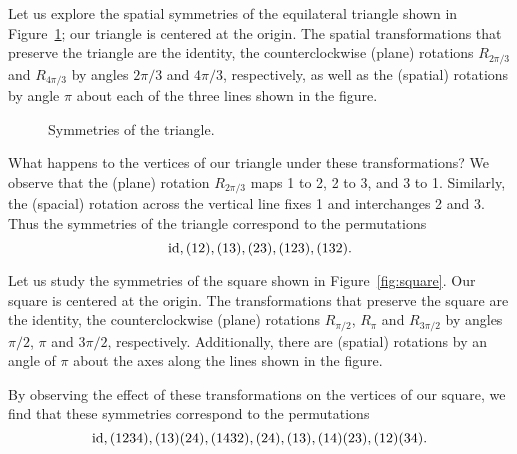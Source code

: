 



\begin{example}
Let us explore the spatial symmetries of the equilateral triangle shown in Figure~\ref{fig:triangle}; our triangle is centered at the origin. The spatial transformations that preserve the triangle are the identity, the counterclockwise (plane) rotations  $R_{2\pi/3}$  and  $R_{4\pi/3}$ by angles $2\pi/3$ and  $4\pi/3$, respectively, as well as the (spatial) rotations by angle  $\pi$  about each of the three lines shown in the figure.
\begin{figure}[h]
\caption{Symmetries of the triangle.}
\label{fig:triangle}
\end{figure}

What happens to the vertices of our triangle under these transformations? We observe that the (plane) rotation  $R_{2\pi/3}$  maps 1 to 2, 2 to 3, and 3 to 1. Similarly, the (spacial) rotation across the vertical line fixes 1 and interchanges 2 and 3. Thus 
the symmetries of the triangle 
correspond to the permutations
\[
\operatorname{id}, (12), (13), (23), (123), (132).
\]
\end{example}

\begin{example}
Let us study the symmetries of the square shown in Figure~\ref{fig:square}. Our square is centered at the origin. The transformations that preserve the square are the identity, the counterclockwise (plane) rotations
$R_{\pi/2}$, $R_{\pi}$ and $R_{3\pi/2}$ by angles 
$\pi/2$, $\pi$ and $3\pi/2$, respectively. Additionally, there are (spatial) rotations by an angle of $\pi$ about the axes along the lines shown in the figure. 
    
By observing the effect of these transformations on the vertices of our square, we find that these symmetries correspond to the permutations
\[
\operatorname{id}, (1234), (13)(24), (1432), (24), (13), (14)(23), (12)(34).
\]
\end{example}

